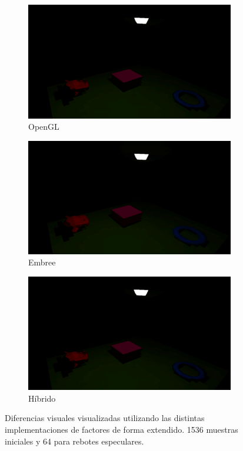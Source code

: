 \begin{figure}[H]
	\centering
	\begin{subfigure}{0.5\textwidth}
		\includegraphics[width=1\linewidth]{assets/caso2gl}
		\caption{OpenGL}
	\end{subfigure}
	\begin{subfigure}{0.5\textwidth}
		\includegraphics[width=1\linewidth]{assets/caso2e}
		\caption{Embree}
	\end{subfigure}
	\begin{subfigure}{0.5\textwidth}
		\includegraphics[width=1\linewidth]{assets/caso2h}
		\caption{Híbrido}
	\end{subfigure}	
	\caption{Diferencias visuales visualizadas utilizando las distintas implementaciones de factores de forma extendido. 1536 muestras iniciales y 64 para rebotes especulares.}
	\label{img:difres}
\end{figure}

